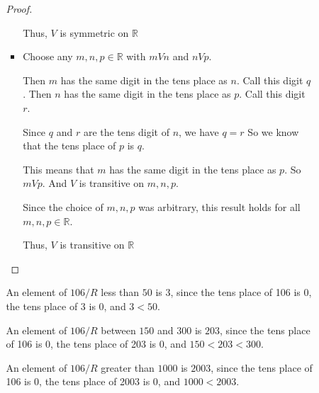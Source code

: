 \documentclass[12pt,letterpaper]{article}
\begin{document}
\begin{enumerate}
\begin{enumerate}
\begin{enumerate}
\begin{proof}
\begin{itemize}
                    Thus, $V$ is symmetric on $\mathbb{R}$
                  \item
                    Choose any $m, n, p \in \mathbb{R}$ with $m V n$ and $n V p$.

                    Then $m$ has the same digit in the tens place as $n$.
                    Call this digit $q$.
                    Then $n$ has the same digit in the tens place as $p$.
                    Call this digit $r$.

                    Since $q$ and $r$ are the tens digit of $n$, we have $q = r$
                    So we know that the tens place of $p$ is $q$.

                    This means that $m$ has the same digit in the tens place as $p$.
                    So $m V p$.
                    And $V$ is transitive on $m, n, p$.

                    Since the choice of $m, n, p$ was arbitrary,
                    this result holds for all $m, n, p \in \mathbb{R}$.

                    Thus, $V$ is transitive on $\mathbb{R}$
                \end{itemize}
              \end{proof}

              An element of $106 / R$ less than $50$ is $3$,
              since the tens place of 106 is 0, the tens place of 3 is 0, and $3 < 50$.

              An element of $106 / R$ between $150$ and $300$ is $203$,
              since the tens place of 106 is 0, the tens place of 203 is 0, and $150 < 203 < 300$.

              An element of $106 / R$ greater than $1000$ is $2003$,
              since the tens place of 106 is 0, the tens place of 2003 is 0, and $1000 < 2003$.


\end{enumerate}
\end{enumerate}
\end{enumerate}
\end{document}
